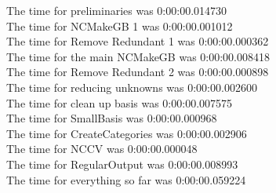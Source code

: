 \documentclass[rep10,leqno]{report}
\begin{document}
\noindent
The time for preliminaries was 0:00:00.014730\\
The time for NCMakeGB 1 was 0:00:00.001012\\
The time for Remove Redundant 1 was 0:00:00.000362\\
The time for the main NCMakeGB was 0:00:00.008418\\
The time for Remove Redundant 2 was 0:00:00.000898\\
The time for reducing unknowns was 0:00:00.002600\\
The time for clean up basis was 0:00:00.007575\\
The time for SmallBasis was 0:00:00.000968\\
The time for CreateCategories was 0:00:00.002906\\
The time for NCCV was 0:00:00.000048\\
The time for RegularOutput was 0:00:00.008993\\
The time for everything so far was 0:00:00.059224\\
\end{document}
